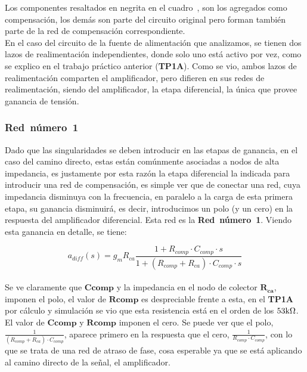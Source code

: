 


Los componentes resaltados en negrita en el cuadro~, son los agregados como compensación, los demás son parte del circuito original pero forman también parte de la red de compensación correspondiente.\\


En el caso del circuito de la fuente de alimentación que analizamos, se tienen dos lazos de realimentación independientes, donde solo uno está activo por vez, como se explico en el trabajo práctico anterior (\textbf{TP1A}). Como se vio, ambos lazos  de realimentación comparten el amplificador, pero difieren en sus redes de realimentación, siendo del amplificador, la etapa diferencial, la única que provee ganancia de tensión.\\


\subsubsection{\textbf{Red~número~1}}

Dado que las singularidades se deben introducir en las etapas de ganancia, en el caso del camino directo, estas están comúnmente asociadas a nodos de alta impedancia, es justamente por esta razón la etapa diferencial la indicada para introducir una red de compensación, es simple ver que de conectar una red, cuya impedancia disminuya con la frecuencia, en paralelo a la carga de esta primera etapa, su ganancia disminuirá, es decir, introducimos un polo (y un cero) en la respuesta del amplificador diferencial. Esta red es la \textbf{Red~número~1}. Viendo esta ganancia en detalle, se tiene:

\begin{equation}
a_{diff}(s) = g_m R_{ca} \frac{1+ R_{comp} \cdot C_{comp} \cdot s}{ 1 + \left( R_{comp}+R_{ca} \right) \cdot C_{comp} \cdot s}
\end{equation}\\

Se ve claramente que  $\bm{Ccomp}$ y la impedancia en el nodo de colector $\bm{R_{ca}}$, imponen el polo, el valor de $\bm{Rcomp}$ es despreciable frente a esta, en el \textbf{TP1A} por cálculo y simulación se vio que esta resistencia está en el orden de los $53 \si[per-mode=symbol]{\kilo\ohm}$. El valor de $\bm{Ccomp}$ y $\bm{Rcomp}$ imponen el cero. Se puede ver que el polo,$\frac{1}{ \left( R_{comp}+R_{ca} \right) \cdot C_{comp} }$, aparece primero en la respuesta que el cero, $ \frac{1}{R_{comp} \cdot C_{comp}}$, con lo que se trata de una red de atraso de fase, cosa esperable ya que se está aplicando al camino directo de la señal, el amplificador.\\

